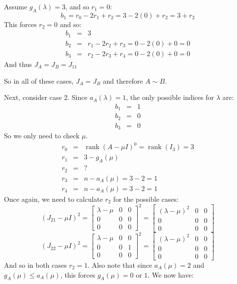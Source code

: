 \documentclass[letterpaper,12pt,fleqn]{article}
\DeclareMathOperator{\rnk}{rank}
\renewcommand{\l}{\lambda}
\newcommand{\m}{\mu}
\begin{document}
\begin{enumerate}
\begin{enumerate}
    Assume $g_A(\l)=3$, and so $r_1=0$:
    \[b_1=r_0-2r_1+r_2=3-2(0)+r_2=3+r_2\]
    This forces $r_2=0$ and so:
    \begin{eqnarray*}
      b_1 &=& 3 \\
      b_2 &=& r_1-2r_2+r_3=0-2(0)+0=0 \\
      b_3 &=& r_2-2r_3+r_4=0-2(0)+0=0
    \end{eqnarray*}
    And thus $J_A=J_B=J_{11}$

    So in all of these cases, $J_A=J_B$ and therefore $A\sim B$.

    Next, consider case 2. Since $a_A(\l)=1$, the only possible indices for $\l$ are:
    \begin{eqnarray*}
      b_1 &=& 1 \\
      b_2 &=& 0 \\
      b_3 &=& 0
    \end{eqnarray*}
    So we only need to check $\m$.
    \begin{eqnarray*}
      r_0 &=& \rnk(A-\m I)^0=\rnk(I_3)=3 \\
      r_1 &=& 3-g_A(\m) \\
      r_2 &=& ? \\
      r_3 &=& n-a_A(\m)=3-2=1 \\
      r_4 &=& n-a_A(\m)=3-2=1
    \end{eqnarray*}
    Once again, we need to calculate $r_2$ for the possible cases:
    \[(J_{21}-\m I)^2=\begin{bmatrix}
    \l-\m & 0 & 0 \\
    0 & 0 & 0 \\
    0 & 0 & 0
    \end{bmatrix}^2=\begin{bmatrix}
    (\l-\m)^2 & 0 & 0 \\
    0 & 0 & 0 \\
    0 & 0 & 0
    \end{bmatrix}\]
    \[(J_{22}-\m I)^2=\begin{bmatrix}
    \l-\m & 0 & 0 \\
    0 & 0 & 1 \\
    0 & 0 & 0
    \end{bmatrix}^2=\begin{bmatrix}
    (\l-\m)^2 & 0 & 0 \\
    0 & 0 & 0 \\
    0 & 0 & 0
    \end{bmatrix}\]
    And so in both cases $r_2=1$. Also note that since $a_A(\m)=2$ and
    $g_A(\m)\le a_A(\m)$, this forces $g_A(\m)=0$ or $1$. We now have:

\end{enumerate}
\end{enumerate}
\end{document}
